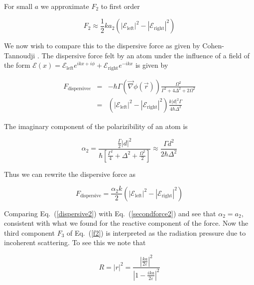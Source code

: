 \documentclass[twocolumn,english,pra,aps,superscriptaddress,floatfix]{revtex4-1}
\begin{document}
For small $a$ we approximate $F_{2}$ to first order

\begin{equation}
F_{2}\approx\frac{1}{2}ka_{2}\left(\left|\mathcal{E}_{\mathrm{left}}\right|^{2}-\left|\mathcal{E}_{\mathrm{right}}\right|^{2}\right)
\label{secondforce2}
\end{equation}

We now wish to compare this to the dispersive force as given by Cohen-Tannoudji \cite{cohentannoudji}. The dispersive force felt by an atom under the influence of a field
of the form $\mathcal{E}(x)=\mathcal{E}_{\mathrm{left}}e^{ikx+i\phi}+\mathcal{E}_{\mathrm{right}}e^{-ikx}$ is given by

\begin{eqnarray}
F_{\mathrm{dispersive}e}&=&-\hbar\Gamma\left(\overrightarrow{\nabla}\phi(\overrightarrow{r})\right)\frac{\Omega^{2}}{\Gamma^{2}+4\Delta^{2}+2\Omega^{2}} \nonumber \\
&=&\left(\left|\mathcal{E}_{\mathrm{left}}\right|^{2}-\left|\mathcal{E}_{\mathrm{right}}\right|^{2}\right)\frac{k\left|d\right|^{2}\Gamma}{4\hbar\Delta^{2}}
\label{dispersive1}
\end{eqnarray}

The imaginary component of the polarizibility of an atom is \cite{cohentannoudji}


\begin{equation}
\alpha_{2}=\frac{\frac{\Gamma}{2}\left|d\right|^{2}}{\hbar\left[\frac{\Gamma^{2}}{4}+\Delta^{2}+\frac{\Omega^{2}}{2}\right]}\approx\frac{\Gamma d^{2}}{2\hbar\Delta^{2}}
\label{polarizibility2}
\end{equation}

Thus we can rewrite the dispersive force as

\begin{equation}
F_{\mathrm{dispersive}}=\frac{\alpha_{2}k}{2}\left(\left|\mathcal{E}_{\mathrm{left}}\right|^{2}-\left|\mathcal{E}_{\mathrm{right}}\right|^{2}\right)
\label{dispersive2}
\end{equation}


Comparing Eq.\ (\ref{dispersive2}) with Eq.\ (\ref{secondforce2}) and see that $\alpha_{2}=a_{2}$, consistent with what we found for the reactive component of the force.  Now the third component $F_{3}$ of Eq.\ (\ref{f2}) is interpreted as the radiation pressure due to incoherent scattering.  To see this we note that

\begin{equation}
R=\left|r\right|^{2}=\frac{\left|\frac{ka}{2\varepsilon}\right|^{2}}{\left|1-\frac{ika}{2\varepsilon}\right|^{2}}
\label{reflectioncoefficient}
\end{equation}
\end{document}
